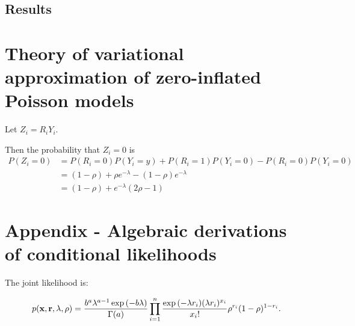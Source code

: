 \documentclass{amsart}[12pt]
\begin{document}
\subsection{Results}

\section{Theory of variational approximation of zero-inflated Poisson models}
Let $Z_i = R_i Y_i$.

Then the probability that $Z_i = 0$ is
$$
\begin{array}{ll}
P(Z_i = 0) &= P(R_i = 0)P(Y_i = y) + P(R_i = 1) P(Y_i = 0) - P(R_i = 0) P(Y_i = 0) \\
&= (1 - \rho) + \rho e^{-\lambda} - (1 - \rho) e^{-\lambda} \\
&= (1 - \rho) + e^{-\lambda}(2 \rho - 1)
\end{array}
$$

\section{Appendix - Algebraic derivations of conditional likelihoods}

The joint likelihood is:

$$
p({\bf x}, {\bf r}, \lambda, \rho) = \frac{b^a \lambda^{a - 1} \exp{(-b \lambda)}}{\Gamma{(a)}} \prod_{i=1}^n \frac{\exp{(-\lambda r_i)} (\lambda r_i)^{x_i}}{x_i !} \rho^{r_i} (1 - \rho)^{1 - r_i}.
$$

%
%
%
\end{document}
